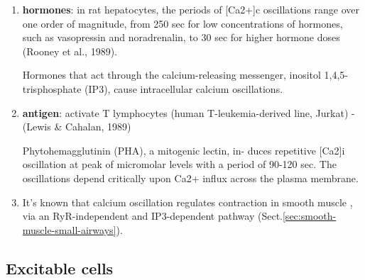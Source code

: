 \begin{enumerate}
  
  \item {\bf hormones}: in rat hepatocytes, the periods of [Ca2+]c oscillations
  range over one order of magnitude, from 250 sec for low concentrations of
  hormones, such as vasopressin and noradrenalin, to 30 sec for higher hormone
  doses (Rooney et al., 1989).


Hormones that act through the calcium-releasing messenger, inositol
1,4,5-trisphosphate (IP3), cause intracellular calcium oscillations.


  \item {\bf antigen}: activate T lymphocytes (human T-leukemia-derived line,
  Jurkat) - (Lewis \& Cahalan, 1989)
  
Phytohemagglutinin (PHA), a mitogenic lectin, in- duces repetitive [Ca2]i
oscillation at peak of micromolar levels with a period of 90-120 sec.
The oscillations depend critically upon Ca2+ influx across the plasma membrane.
  
  \item It's known that calcium oscillation regulates contraction in smooth muscle
\citep{bai2009, sanderson2010}, via an RyR-independent and IP3-dependent pathway
(Sect.\ref{sec:smooth-muscle-small-airways}).

\end{enumerate}

% 
% 

\subsection{Excitable cells}
\label{sec:calcium-oscillation-excitable-cell}



